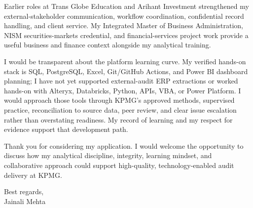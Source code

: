 \documentclass[letterpaper,11pt]{article}
\begin{document}
\bigbreak
Earlier roles at Trans Globe Education and Arihant Investment strengthened my external-stakeholder communication, workflow coordination, confidential record handling, and client service. My Integrated Master of Business Administration, NISM securities-markets credential, and financial-services project work provide a useful business and finance context alongside my analytical training.

\bigbreak
I would be transparent about the platform learning curve. My verified hands-on stack is SQL, PostgreSQL, Excel, Git/GitHub Actions, and Power BI dashboard planning; I have not yet supported external-audit ERP extractions or worked hands-on with Alteryx, Databricks, Python, APIs, VBA, or Power Platform. I would approach those tools through KPMG's approved methods, supervised practice, reconciliation to source data, peer review, and clear issue escalation rather than overstating readiness. My record of learning and my respect for evidence support that development path.

\bigbreak
Thank you for considering my application. I would welcome the opportunity to discuss how my analytical discipline, integrity, learning mindset, and collaborative approach could support high-quality, technology-enabled audit delivery at KPMG.

\bigbreak
Best regards,\\
Jainali Mehta
\end{document}
